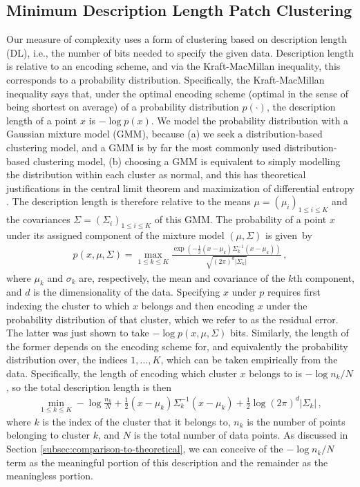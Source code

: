 \documentclass[a4paper,fleqn]{cas-sc}
\theoremstyle{remark}
\begin{document}
\subsection{Minimum Description Length Patch Clustering}
Our measure of complexity uses a form of clustering based on description length (DL), i.e., the number of bits needed to specify the given data. Description length is relative to an encoding scheme, and via the Kraft-MacMillan inequality, this corresponds to a probability distribution. Specifically, the Kraft-MacMillan inequality says that, under the optimal encoding scheme (optimal in the sense of being shortest on average) of a probability distribution $p(\cdot)$, the description length of a point $x$ is $-\log p(x)$. We model the probability distribution with a Gaussian mixture model (GMM), because (a) we seek a distribution-based clustering model, and a GMM is by far the most commonly used distribution-based clustering model, (b) choosing a GMM is equivalent to simply modelling the distribution within each cluster as normal, and this has theoretical justifications in the central limit theorem and maximization of differential entropy \citep{thomas2006elements}. The description length is therefore relative to the means $\mu = (\mu_i)_{1 \leq i \leq K}$ and the covariances $\Sigma = (\Sigma_i)_{1 \leq i \leq K}$ of this GMM. The probability of a point $x$ under its assigned component of the mixture model $(\mu,\Sigma)$ is given~by
\begin{align} \label{eq:MVN-prob}
    p(x, \mu, \Sigma) = \max_{1 \leq k \leq K} \frac{\exp(-\tfrac{1}{2}(x- \mu_{k})\Sigma_{k}^{-1}(x-\mu_{k}))}{\sqrt{(2 \pi)^{d}|\Sigma_{k}|}}\,,
\end{align}
where $\mu_k$ and $\sigma_k$ are, respectively, the mean and covariance of the $k$th component, and $d$ is the dimensionality of the data. Specifying $x$ under $p$ requires first indexing the cluster to which $x$ belongs and then encoding $x$ under the probability distribution of that cluster, which we refer to as the residual error. The latter was just shown to take $-\log p(x, \mu, \Sigma)$ bits. Similarly, the length of the former depends on the encoding scheme for, and equivalently the probability distribution over, the indices $1, \dots, K$, which can be taken empirically from the data. Specifically, the length of encoding which cluster $x$ belongs to is $-\log {n_k}/{N}$, so the total description length is then 
\begin{align} \label{eq:MVN-DL}
    \min_{1 \leq k \leq K} -\log \tfrac{n_k}{N} + \tfrac{1}{2}(x- \mu_{k})\Sigma_{k}^{-1}(x-\mu_{k}) + \tfrac{1}{2}\log{(2 \pi)^{d}|\Sigma_{k}|}\,,
\end{align}
where $k$ is the index of the cluster that it belongs to, $n_k$ is the number of points belonging to cluster $k$, and $N$ is the total number of data points. As discussed in Section \ref{subsec:comparison-to-theoretical}, we can conceive of the $-\log {n_k}/{N}$ term as the meaningful portion of this description and the remainder as the meaningless portion.
\end{document}
